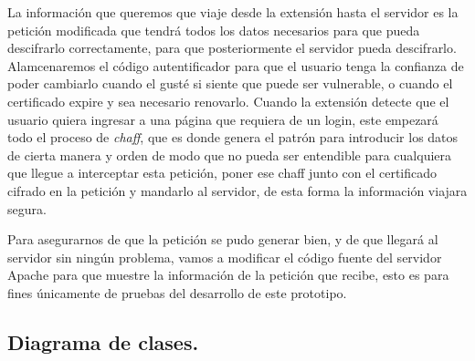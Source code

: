 \documentclass[12pt, a4paper, titlepage]{report}
\begin{document}
			    La información que queremos que viaje desde la extensión hasta el servidor es la petición modificada que tendrá todos los datos necesarios para que pueda descifrarlo correctamente, para que posteriormente el servidor pueda descifrarlo. Alamcenaremos el código autentificador para que el usuario tenga la confianza de poder cambiarlo cuando el gusté si siente que puede ser vulnerable, o cuando el certificado expire y sea necesario renovarlo. Cuando la extensión detecte que el usuario quiera ingresar a una página que requiera de un login, este empezará todo el proceso de \textit{chaff}, que es donde genera el patrón para introducir los datos de cierta manera y orden de modo que no pueda ser entendible para cualquiera que llegue a interceptar esta petición, poner ese chaff junto con el certificado cifrado en la petición y mandarlo al servidor, de esta forma la información viajara segura. 
			    
			    Para asegurarnos de que la petición se pudo generar bien, y de que llegará al servidor sin ningún problema, vamos a modificar el código fuente del servidor Apache para que muestre la información de la petición que recibe, esto es para fines únicamente de pruebas del desarrollo de este prototipo.
			
			\subsection{Diagrama de clases.}
			
\end{document}
